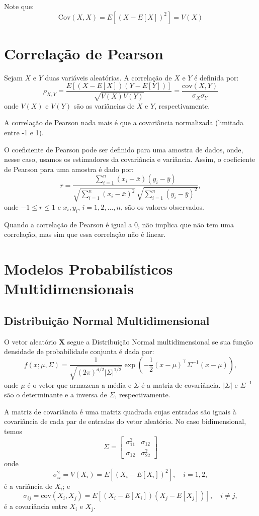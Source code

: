 \documentclass{article}
\begin{document}
Note que:
    $$
    \mathrm{Cov}(X, X) = E\left[(X - E\left[X\right])^2\right] = V(X)
    $$

\section{Correlação de Pearson}
\label{sec:correlacao_pearson}
Sejam $X$ e $Y$ duas variáveis aleatórias. A correlação de $X$ e $Y$ é definida por:
    $$
    \rho_{X,Y} =
    \frac{E[(X - E[X])(Y - E[Y])]}{\sqrt{V(X)V(Y)}} =
    \frac{\mathrm{cov}(X, Y)}{\sigma_X \sigma_Y}
    $$
onde $V(X)$ e $V(Y)$ são as variâncias de $X$ e $Y$, respectivamente.

A correlação de Pearson nada mais é que a covariância normalizada (limitada entre -1 e 1).

O coeficiente de Pearson pode ser definido para uma amostra de dados, onde, nesse caso, usamos os estimadores da covariância e variância.
Assim, o coeficiente de Pearson para uma amostra é dado por:
    $$
    r = \frac{\sum_{i=1}^{n} (x_i - \bar{x})(y_i - \bar{y})}
    {\sqrt{\sum_{i=1}^{n} (x_i - \bar{x})^2} \, \sqrt{\sum_{i=1}^{n} (y_i - \bar{y})^2}},
    $$
onde $-1 \leq r \leq 1$ e $x_i, y_i$, $i = 1, 2, \ldots, n$, são os valores observados.

Quando a correlação de Pearson é igual a 0, não implica que não tem uma correlação, mas sim que essa correlação não é linear.

\section{Modelos Probabilísticos Multidimensionais}
\subsection{Distribuição Normal Multidimensional}

O vetor aleatório $\mathbf{X}$ segue a Distribuição Normal multidimensional se sua função densidade de probabilidade conjunta é dada por:
    $$
    f(x; \mu, \Sigma) =
    \frac{1}{\sqrt{(2\pi)^{d/2}|\Sigma|^{1/2}}}
    \exp\left( -\frac{1}{2}(x - \mu)^\top \Sigma^{-1} (x - \mu) \right),
    $$
onde $\mu$ é o vetor que armazena a média e $\Sigma$ é a matriz de covariância.
$|\Sigma|$ e $\Sigma^{-1}$ são o determinante e a inversa de $\Sigma$, respectivamente.

A matriz de covariância é uma matriz quadrada cujas entradas são iguais à covariância de cada par de entradas do vetor aleatório.
No caso bidimensional, temos
    $$
    \Sigma =
    \begin{bmatrix}
    \sigma_{11}^2 & \sigma_{12} \\
    \sigma_{12} & \sigma_{22}^2
    \end{bmatrix}
    $$
onde
    $$
    \sigma_{ii}^2 = V(X_i) = E\left[(X_i - E[X_i])^2\right], \quad i = 1,2,
    $$
é a variância de $X_i$; e
    $$
    \sigma_{ij} = \mathrm{cov}(X_i, X_j) = E\left[(X_i - E[X_i])(X_j - E[X_j])\right], \quad i \neq j,
    $$
é a covariância entre $X_i$ e $X_j$.
\end{document}
